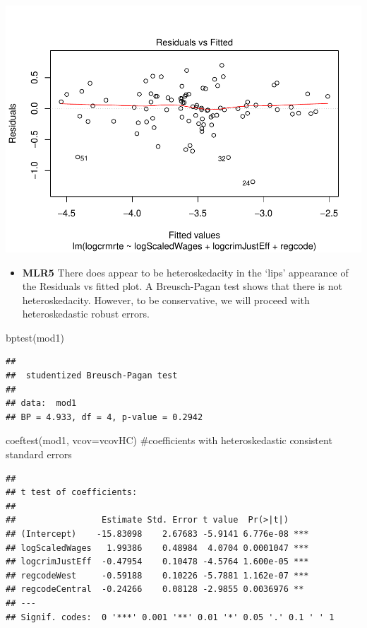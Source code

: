 \documentclass[]{article}
\newenvironment{Shaded}{}{}
\newcommand{\CommentTok}[1]{\textcolor[rgb]{0.00,0.50,0.00}{#1}}
\newcommand{\DataTypeTok}[1]{#1}
\newcommand{\KeywordTok}[1]{\textcolor[rgb]{0.00,0.00,1.00}{#1}}
\newcommand{\NormalTok}[1]{#1}
\providecommand{\tightlist}{%
  \setlength{\itemsep}{0pt}\setlength{\parskip}{0pt}}
\begin{document}
\includegraphics{Bagnard_Gaustad_Hartman_Leung_Lab_3_files/figure-latex/unnamed-chunk-62-1.pdf}

\begin{itemize}
\tightlist
\item
  \textbf{MLR5} There does appear to be heteroskedacity in the `lips'
  appearance of the Residuals vs fitted plot. A Breusch-Pagan test shows
  that there is not heteroskedacity. However, to be conservative, we
  will proceed with heteroskedastic robust errors.
\end{itemize}

\begin{Shaded}
\begin{Highlighting}[]
\KeywordTok{bptest}\NormalTok{(mod1)}
\end{Highlighting}
\end{Shaded}

\begin{verbatim}
## 
##  studentized Breusch-Pagan test
## 
## data:  mod1
## BP = 4.933, df = 4, p-value = 0.2942
\end{verbatim}

\begin{Shaded}
\begin{Highlighting}[]
\KeywordTok{coeftest}\NormalTok{(mod1, }\DataTypeTok{vcov=}\NormalTok{vcovHC) }\CommentTok{#coefficients with heteroskedastic consistent standard errors}
\end{Highlighting}
\end{Shaded}

\begin{verbatim}
## 
## t test of coefficients:
## 
##                 Estimate Std. Error t value  Pr(>|t|)    
## (Intercept)    -15.83098    2.67683 -5.9141 6.776e-08 ***
## logScaledWages   1.99386    0.48984  4.0704 0.0001047 ***
## logcrimJustEff  -0.47954    0.10478 -4.5764 1.600e-05 ***
## regcodeWest     -0.59188    0.10226 -5.7881 1.162e-07 ***
## regcodeCentral  -0.24266    0.08128 -2.9855 0.0036976 ** 
## ---
## Signif. codes:  0 '***' 0.001 '**' 0.01 '*' 0.05 '.' 0.1 ' ' 1
\end{verbatim}
\end{document}

